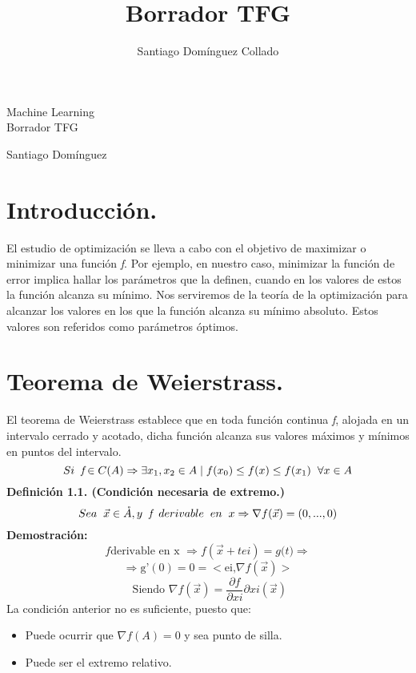 \documentclass[a4paper,10pt]{article}
\author{Santiago Domínguez Collado}
\title{Borrador TFG}
\begin{document}
\begin{center}
\begin{LARGE}
Machine Learning \\
\vspace*{0.15in}
\UseRawInputEncoding
Borrador TFG
\end{LARGE}
\end{center}
\begin{center}
\begin{large}
Santiago Domínguez
\end{large}
\end{center}

\section{Introducción.}
\label{}
\noindent
El estudio de optimización se lleva a cabo con el objetivo de maximizar o minimizar una función \textit{f}.
Por ejemplo, en nuestro caso, minimizar la función de error implica hallar los parámetros que la definen, cuando en los valores de estos la función alcanza su mínimo.
Nos serviremos de la teoría de la optimización para alcanzar los valores en los que la función alcanza su mínimo absoluto. Estos valores son referidos como parámetros óptimos.
\section{Teorema de Weierstrass.}
\noindent
El teorema de Weierstrass establece que en toda función continua \textit{f}, alojada en un intervalo cerrado y acotado, dicha función alcanza sus valores máximos y mínimos en puntos del intervalo.
 \[Si \hspace{0.20cm} \textit{f} \in C(A) \Rightarrow \exists x_{1},x_{2} \in A \mid f(x_{0}) \leq f(x) \leq f(x_{1}) \hspace{0.20cm} \forall x \in A\] 
\textbf{Definición 1.1. (Condición necesaria de extremo.)}
\noindent
\[Sea \hspace{0.20cm} \vec{x} \in \mathring{A}, y\hspace{0.20cm} \textit{f}\hspace{0.20cm} derivable\hspace{0.20cm} en \hspace{0.20cm}x \Rightarrow \nabla f(\vec{x}) = (0,...,0)\]
\textbf{Demostración:} \[f \text{derivable en x } \Rightarrow f(\vec{x}+tei)=\textit{g(t)}\Rightarrow \] 
\[ \Rightarrow \text{g'} (0)=0= <\text{ei,} \nabla f(\vec{x}) >\] 
\[\text{ Siendo }  \nabla f(\vec{x})= \frac{\partial f}{\partial xi} \partial xi (\vec{x})\]
La condición anterior no es suficiente, puesto que:
\begin{itemize}
    \item Puede ocurrir que $\nabla f(A) = 0$ y sea punto de silla.
    \item Puede ser el extremo relativo.
\end{itemize}
\end{document}

